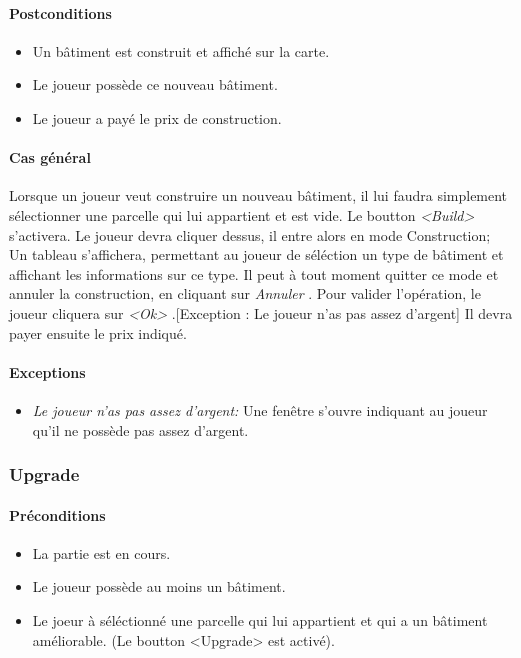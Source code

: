 \documentclass[a4paper,11pt]{report}
\begin{document}
\paragraph{Postconditions}
\begin{itemize}
 \item Un bâtiment est construit et affiché sur la carte.
 \item Le joueur possède ce nouveau bâtiment.
 \item Le joueur a payé le prix de construction.
\end{itemize}
\paragraph{Cas général}
Lorsque un joueur veut construire un nouveau bâtiment, il lui faudra simplement sélectionner une parcelle qui lui appartient et est vide. Le boutton \og \textit{<Build>} \fg s'activera. Le joueur devra cliquer dessus, il entre alors en mode Construction; Un tableau s'affichera, permettant au joueur de séléction un type de bâtiment et affichant les informations sur ce type. Il peut à tout moment quitter ce mode et annuler la construction, en cliquant sur \og \textit{Annuler} \fg. Pour valider l'opération, le joueur cliquera sur \og \textit{<Ok>} \fg.[Exception : Le joueur n'as pas assez d'argent] Il devra payer ensuite le prix indiqué.
\paragraph{Exceptions}
\begin{itemize}
 \item \textit{Le joueur n'as pas assez d'argent:}  Une fenêtre s'ouvre indiquant au joueur qu'il ne possède pas assez d'argent.
\end{itemize}
\subsubsection{Upgrade}
\paragraph{Préconditions}
\begin{itemize}
 \item La partie est en cours.
 \item Le joueur possède au moins un bâtiment.
 \item Le joeur à séléctionné une parcelle qui lui appartient et qui a un bâtiment améliorable. (Le boutton <Upgrade> est activé).
\end{itemize}
\end{document}
